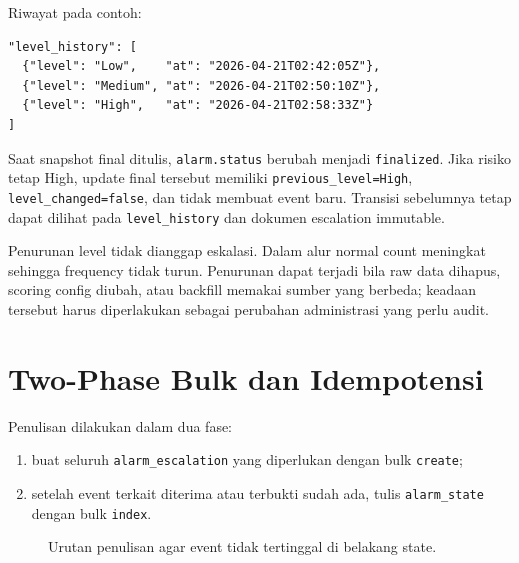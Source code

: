 \documentclass[11pt,a4paper,oneside]{report}
\DeclareRobustCommand{\code}[1]{\nolinkurl{#1}}
\begin{document}
Riwayat pada contoh:

\begin{lstlisting}
"level_history": [
  {"level": "Low",    "at": "2026-04-21T02:42:05Z"},
  {"level": "Medium", "at": "2026-04-21T02:50:10Z"},
  {"level": "High",   "at": "2026-04-21T02:58:33Z"}
]
\end{lstlisting}

Saat snapshot final ditulis, \code{alarm.status} berubah menjadi
\code{finalized}. Jika risiko tetap High, update final tersebut memiliki
\code{previous\_level=High}, \code{level\_changed=false}, dan tidak membuat event
baru. Transisi sebelumnya tetap dapat dilihat pada \code{level\_history} dan
dokumen escalation immutable.

Penurunan level tidak dianggap eskalasi. Dalam alur normal count meningkat sehingga
frequency tidak turun. Penurunan dapat terjadi bila raw data dihapus, scoring config
diubah, atau backfill memakai sumber yang berbeda; keadaan tersebut harus diperlakukan
sebagai perubahan administrasi yang perlu audit.

\chapter{Two-Phase Bulk dan Idempotensi}

Penulisan dilakukan dalam dua fase:

\begin{enumerate}
  \item buat seluruh \code{alarm\_escalation} yang diperlukan dengan bulk
        \code{create};
  \item setelah event terkait diterima atau terbukti sudah ada, tulis
        \code{alarm\_state} dengan bulk \code{index}.
\end{enumerate}

\begin{figure}[ht]
\centering
{}
\caption{Urutan penulisan agar event tidak tertinggal di belakang state.}
\end{figure}
\end{document}
